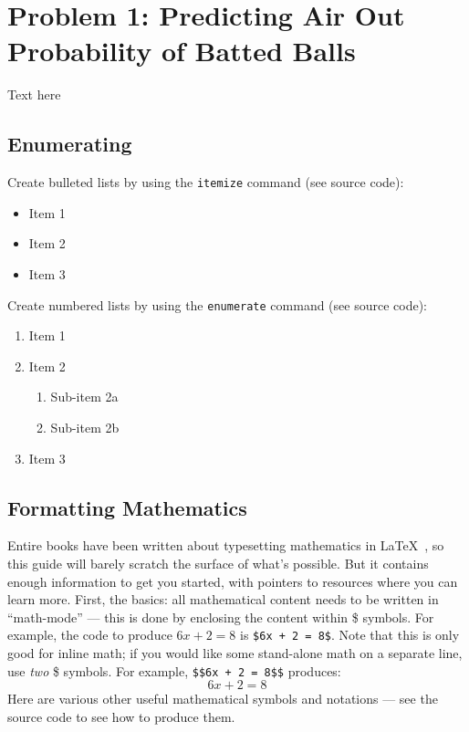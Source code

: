 
\section*{Problem 1: Predicting Air Out Probability of Batted Balls}
\label{sec:p1}

Text here

\subsection{Enumerating}
\label{subsec:enum}

Create bulleted lists by using the \texttt{itemize} command (see source code):
\begin{itemize}
  \item Item 1
  \item Item 2
  \item Item 3
\end{itemize}
Create numbered lists by using the \texttt{enumerate} command (see source code):
\begin{enumerate}
  \item Item 1
  \item Item 2
    \begin{enumerate}
    \item Sub-item 2a
    \item Sub-item 2b
    \end{enumerate}
  \item Item 3
\end{enumerate}

\subsection{Formatting Mathematics}
\label{subsec:math}

Entire books have been written about typesetting mathematics in
\LaTeX~, so this guide will barely scratch the surface of what's
possible. But it contains enough information to get you started, with
pointers to resources where you can learn more. First, the basics: all
mathematical content needs to be written in ``math-mode'' --- this is
done by enclosing the content within \$ symbols. For example, the code
to produce $6x + 2 = 8$ is \texttt{\$6x + 2 = 8\$}. Note that this is
only good for inline math; if you would like some stand-alone math on
a separate line, use \emph{two} \$ symbols. For example,
\texttt{\$\$6x + 2 = 8\$\$} produces: $$6x+2 = 8$$ Here are various
other useful mathematical symbols and notations --- see the source
code to see how to produce them.

